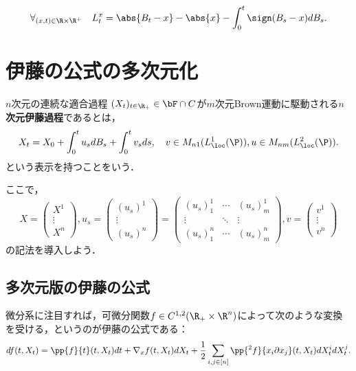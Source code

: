 \documentclass[uplatex,dvipdfmx]{jsreport}
\begin{document}
\begin{corollary}
    \[\forall_{(x,t)\in\R\times\R^+}\quad L^x_t=\abs{B_t-x}-\abs{x}-\int^t_0\sign(B_s-x)dB_s.\]
\end{corollary}

\section{伊藤の公式の多次元化}

\begin{definition}
    $n$次元の連続な適合過程
    $(X_t)_{t\in\R_+}\in\bF\cap C$が$m$次元Brown運動に駆動される\textbf{$n$次元伊藤過程}であるとは，
    \[X_t=X_0+\int^t_0u_sdB_s+\int^t_0v_sds,\quad v\in M_{n1}(L^1_\loc(\P)),u\in M_{nm}(L^2_\loc(\P)).\]
    という表示を持つことをいう．
\end{definition}

\begin{notation}
    ここで，
    \[X=\begin{pmatrix}X^1\\\vdots\\X^n\end{pmatrix},u_s= \begin{pmatrix}(u_s)^1\\\vdots\\(u_s)^n\end{pmatrix} =\begin{pmatrix}(u_s)^1_1&\cdots&(u_s)^1_m\\\vdots&\ddots&\vdots\\(u_s)^n_1&\cdots&(u_s)^n_m\end{pmatrix},v=\begin{pmatrix}v^1\\\vdots\\v^n\end{pmatrix}\]
    の記法を導入しよう．
\end{notation}

\subsection{多次元版の伊藤の公式}

\begin{tcolorbox}[colframe=ForestGreen, colback=ForestGreen!10!white,breakable,colbacktitle=ForestGreen!40!white,coltitle=black,fonttitle=\bfseries\sffamily,
title=]
    微分系に注目すれば，可微分関数$f\in C^{1,2}(\R_+\times\R^n)$によって次のような変換を受ける，というのが伊藤の公式である：
    \[df(t,X_t)=\pp{f}{t}(t,X_t)dt+\nabla_xf(t,X_t)dX_t+\frac{1}{2}\sum_{i,j\in[n]}\pp{^2f}{x_i\partial x_j}(t,X_t)dX_t^idX_t^j.\]
\end{tcolorbox}
\end{document}
